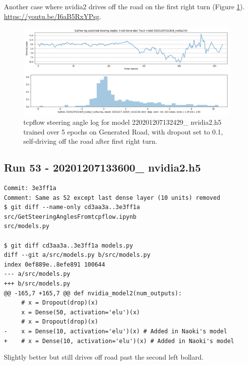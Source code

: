 Another case where nvidia2 drives off the road on the first right turn (Figure \ref{fig:20201207132429_nvidia2_tcpflow}). \url{https://youtu.be/I6aB5RxYPsg}.
\begin{figure}[ht]
 \centering 
 \includegraphics[width=\textwidth]{Figures/20201207132429_nvidia2_tcpflow.png}
 \caption{tcpflow steering angle log for model 220201207132429\_ nvidia2.h5 trained over 5 epochs on Generated Road, with dropout set to 0.1, self-driving off the road after first right turn.}
 \label{fig:20201207132429_nvidia2_tcpflow}
\end{figure}

\subsection{Run 53 - 20201207133600\_ nvidia2.h5 }
\label{app_res:XX}
\begin{verbatim}
Commit: 3e3ff1a
Comment: Same as 52 except last dense layer (10 units) removed
$ git diff --name-only cd3aa3a..3e3ff1a
src/GetSteeringAnglesFromtcpflow.ipynb
src/models.py

$ git diff cd3aa3a..3e3ff1a models.py
diff --git a/src/models.py b/src/models.py
index 0ef889e..8efe891 100644
--- a/src/models.py
+++ b/src/models.py
@@ -165,7 +165,7 @@ def nvidia_model2(num_outputs):
     # x = Dropout(drop)(x)
     x = Dense(50, activation='elu')(x)
     # x = Dropout(drop)(x)
-    x = Dense(10, activation='elu')(x) # Added in Naoki's model
+    # x = Dense(10, activation='elu')(x) # Added in Naoki's model

\end{verbatim}

Slightly better but still drives off road past the second left bollard.

